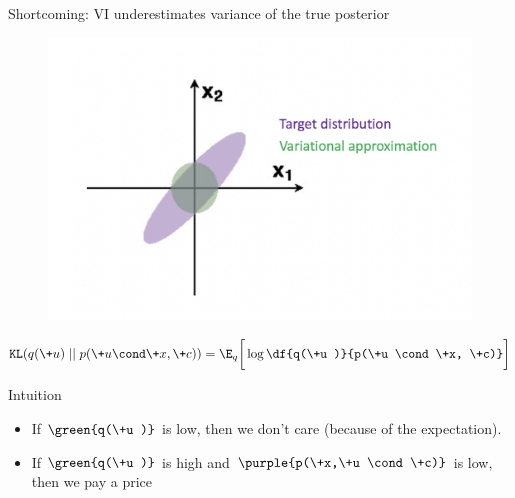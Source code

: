 \documentclass[10pt]{beamer}
\begin{document}
\begin{frame}{Shortcoming: VI underestimates variance of the true posterior}


	\begin{figure}
	\includegraphics[width=.7\textwidth]{images/underfit_variance_2.png}
	\end{figure}


\[ \texttt{KL} (q(\+u) \; || \; p(\+u \cond \+x, \+c)) =  \E_q \bigg[\log \df{q(\+u )}{p(\+u \cond \+x, \+c)} \bigg]  \]
 
Intuition 
\begin{itemize}

\item If $ \green{q(\+u )}$ is low, then we don't care (because of the expectation).   
\item If $ \green{q(\+u )}$ is high and $ \purple{p(\+x,\+u \cond \+c)}$  is low, then we pay a price
\end{itemize}

\end{frame}
\end{document}
